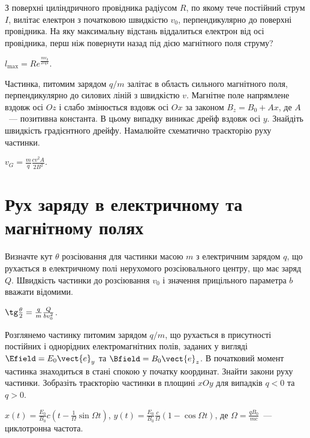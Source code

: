 \begin{problem}
З поверхні циліндричного провідника радіусом $R$, по якому тече постійний струм $I$, вилітає електрон з початковою швидкістю $v_0$, перпендикулярно до поверхні провідника. На яку максимальну відстань віддалиться електрон від осі провідника, перш ніж повернути назад під дією магнітного поля струму?
\begin{solution}
	$l_{\max} = Re^{\frac{mv_0}{2cqI}}$.
\end{solution}
\end{problem}

\begin{problem}
    Частинка, питомим зарядом $q/m$ залітає в область сильного магнітного поля, перпендикулярно до силових ліній з швидкістю $v$. Магнітне поле напрямлене вздовж осі $Oz$ і слабо змінюється вздовж осі $Ox$ за законом $B_z = B_0 + Ax$, де $A$~--- позитивна константа. В цьому випадку виникає дрейф вздовж осі $y$. Знайдіть швидкість градієнтного дрейфу. Намалюйте схематично траєкторію руху частинки.
\begin{solution}
	$v_G = \frac{m}{q}\frac{cv^2A}{2B^2}.$
\end{solution}
\end{problem}



\section{Рух заряду в електричному та магнітному полях}


\begin{problem}
    Визначте кут $\theta$ розсіювання для частинки масою $m$ з електричним зарядом $q$, що рухається в електричному полі нерухомого розсіювального центру, що має заряд $Q$. Швидкість частинки до розсіювання $v_0$ і значення прицільного параметра $b$ вважати відомими.
\begin{solution}
	$\tg\frac{\theta}{2} = \frac qm \frac{Q}{bv_0^2}$.
\end{solution}
\end{problem}

\begin{problem}\label{MotioninEM}
Розглянемо частинку питомим зарядом $q/m$, що рухається в присутності постійних і однорідних електромагнітних полів, заданих у вигляді $\Efield = E_0\vect{e}_y$ та $\Bfield = B_0\vect{e}_z$. В початковий момент частинка знаходиться в стані спокою у початку координат. Знайти закони руху частинки. Зобразіть траєкторію частинки в площині $xOy$ для випадків $q < 0$ та  $q> 0$.
\begin{solution}
	$x(t)  = \frac{E_0}{B_0}c\left( t - \frac{1}{\Omega}\sin\Omega t \right) $,
	$y(t)  = \frac{E_0}{B_0} \frac{c}{\Omega}\left( 1 - \cos\Omega t \right) $, де $\Omega = \frac{qB_0}{mc}$~--- циклотронна частота.
\end{solution}
\end{problem}

